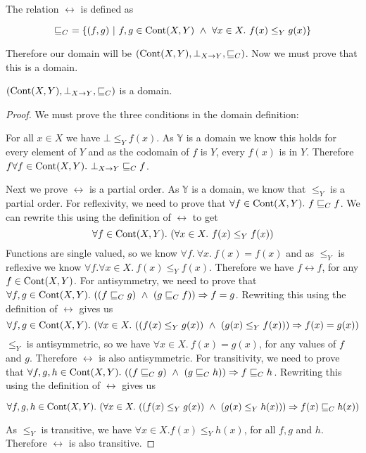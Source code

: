 The relation $\rel$ is defined as

\[ \sqsubseteq_{C}  \ = \{ (f , g) \ | \ f,g \in \operatorname{Cont}(X,Y) \ \wedge \ \forall x \in X. \ f(x) \leq_Y g(x)\} \]

Therefore our domain will be $(\operatorname{Cont}(X,Y), \bot_{X \to Y}, \sqsubseteq_C)$. Now we must prove that this is a domain.

\vspace{0.5cm}

\begin{lem}
$(\operatorname{Cont}(X,Y), \bot_{X \to Y}, \sqsubseteq_C)$ is a domain.
\end{lem}

\begin{proof}
We must prove the three conditions in the domain definition:

For all $x \in X$ we have $\bot \leq_Y f(x)$. As $\mathbb{Y}$ is a domain we know this holds for every element of $Y$ and as the codomain of $f$ is $Y$, every $f(x)$ is in $Y$. Therefore $f\forall f \in \cont(X,Y). \ \bot_{X \to Y} \rel f$.

Next we prove $\rel$ is a partial order. As $\mathbb{Y}$ is a domain, we know that $\leq_Y$ is a partial order. For reflexivity, we need to prove that $\forall f \in \operatorname{Cont}(X,Y). \ f \sqsubseteq_{C} f$. We can rewrite this using the definition of $\rel$ to get 
\[\forall f \in \operatorname{Cont}(X,Y). \ (\forall x \in X. \ f(x) \leq_Y f(x))\]
 Functions are single valued, so we know $\forall f. \ \forall x. \ f(x) = f(x)$ and as $\leq_Y$ is reflexive we know $\forall f. \forall x \in X. \ f(x) \leq_Y f(x)$. Therefore we have $f \rel f$, for any $f \in \operatorname{Cont}(X,Y)$. For antisymmetry, we need to prove that $\forall f,g \in \operatorname{Cont}(X,Y). \ ((f \sqsubseteq_{C} g) \ \wedge \ (g \sqsubseteq_{C} f)) \Rightarrow f = g$. Rewriting this using the definition of $\rel$ gives us
 \[\forall f,g \in \cont(X,Y). \ (\forall x \in X. \ ((f(x) \leq_Y g(x)) \ \wedge \ (g(x) \leq_Y f(x))) \Rightarrow f(x) = g(x))\] 
 $\leq_Y$ is antisymmetric, so we have $\forall x \in X. \ f(x) = g(x)$, for any values of $f$ and $g$. Therefore $\rel$ is also antisymmetric. For transitivity, we need to prove that $\forall f,g,h \in \operatorname{Cont}(X,Y). \ ((f \sqsubseteq_{C} g) \  \wedge \ (g \sqsubseteq_{C} h)) \Rightarrow f \sqsubseteq_{C} h$. Rewriting this using the definition of $\rel$ gives us 

\[\forall f,g,h \in \operatorname{Cont}(X,Y). \ (\forall x \in X. \ ((f(x) \leq_Y g(x)) \ \wedge \ (g(x) \leq_Y h(x))) \Rightarrow f(x) \sqsubseteq_{C} h(x)) \]
 
As $\leq_Y$ is transitive, we have $\forall x \in X.f(x) \leq_Y h(x)$, for all $f, g$ and $h$. Therefore $\rel$ is also transitive. 


\end{proof}
